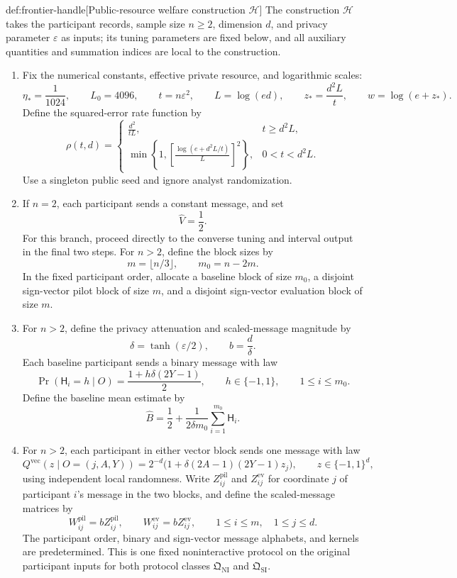 \begin{algorithmv}{def:frontier-handle}[Public-resource welfare construction $\mathscr H$]
The construction \(\mathscr H\) takes the participant records, sample size \(n\ge2\), dimension \(d\), and privacy parameter \(\varepsilon\) as inputs; its tuning parameters are fixed below, and all auxiliary quantities and summation indices are local to the construction.
\begin{enumerate}
\item Fix the numerical constants, effective private resource, and logarithmic scales:
\[
\eta_*=\frac1{1024},
\qquad L_0=4096,
\qquad t=n\varepsilon^2,
\qquad L=\log(ed),
\qquad z_*=\frac{d^2L}{t},
\qquad w=\log(e+z_*).
\]
Define the squared-error rate function by
\[
\rho(t,d)=
\begin{cases}
\displaystyle\frac{d^2}{tL},&t\ge d^2L,\\[3pt]
\displaystyle\min\left\{1,
\left[\frac{\log(e+d^2L/t)}{L}\right]^2\right\},
&0<t<d^2L.
\end{cases}
\]
Use a singleton public seed and ignore analyst randomization.

\item If \(n=2\), each participant sends a constant message, and set
\[
\widehat V=\frac12.
\]
For this branch, proceed directly to the converse tuning and interval output in the final two steps. For \(n>2\), define the block sizes by
\[
m=\lfloor n/3\rfloor,
\qquad m_0=n-2m.
\]
In the fixed participant order, allocate a baseline block of size \(m_0\), a disjoint sign-vector pilot block of size \(m\), and a disjoint sign-vector evaluation block of size \(m\).

\item For \(n>2\), define the privacy attenuation and scaled-message magnitude by
\[
\delta=\tanh(\varepsilon/2),
\qquad b=\frac d\delta.
\]
Each baseline participant sends a binary message with law
\[
\Pr(\mathsf H_i=h\mid O)
=\frac{1+h\delta(2Y-1)}2,
\qquad h\in\{-1,1\},
\qquad 1\le i\le m_0.
\]
Define the baseline mean estimate by
\[
\widehat B
=\frac12+\frac1{2\delta m_0}
\sum_{i=1}^{m_0}\mathsf H_i.
\]

\item For \(n>2\), each participant in either vector block sends one message with law
\[
Q^{\mathrm{vec}}(z\mid O=(j,A,Y))
=
2^{-d}\bigl(1+\delta(2A-1)(2Y-1)z_j\bigr),
\qquad z\in\{-1,1\}^d,
\]
using independent local randomness. Write \(Z^{\mathrm{pil}}_{ij}\) and \(Z^{\mathrm{ev}}_{ij}\) for coordinate \(j\) of participant \(i\)'s message in the two blocks, and define the scaled-message matrices by
\[
W^{\mathrm{pil}}_{ij}=bZ^{\mathrm{pil}}_{ij},
\qquad
W^{\mathrm{ev}}_{ij}=bZ^{\mathrm{ev}}_{ij},
\qquad 1\le i\le m,\quad 1\le j\le d.
\]
The participant order, binary and sign-vector message alphabets, and kernels are predetermined. This is one fixed noninteractive protocol on the original participant inputs for both protocol classes \(\mathfrak Q_{\mathrm{NI}}\) and \(\mathfrak Q_{\mathrm{SI}}\).


\end{enumerate}
\end{algorithmv}
